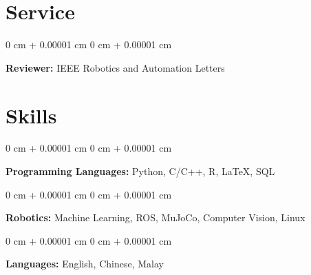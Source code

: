 \documentclass[10pt, letterpaper]{article}
\newenvironment{onecolentry}{
    \begin{adjustwidth}{
        0 cm + 0.00001 cm
    }{
        0 cm + 0.00001 cm
    }
}{
    \end{adjustwidth}
} %
\begin{document}
    
    \section{Service}



        
        \begin{onecolentry}
            \textbf{Reviewer:} IEEE Robotics and Automation Letters
        \end{onecolentry}


    
    \section{Skills}



        
        \begin{onecolentry}
            \textbf{Programming Languages:} Python, C/C++, R, LaTeX, SQL
        \end{onecolentry}

        \vspace{0.2 cm}

        \begin{onecolentry}
            \textbf{Robotics:} Machine Learning, ROS, MuJoCo, Computer Vision, Linux
        \end{onecolentry}

        \vspace{0.2 cm}

        \begin{onecolentry}
            \textbf{Languages:} English, Chinese, Malay
        \end{onecolentry}


    
\end{document}
